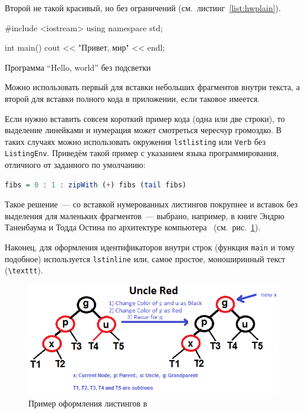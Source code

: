Второй не такой красивый, но без ограничений (см.~листинг~\ref{list:hwplain}).
\begin{ListingEnv}[H]
\begin{Verb}

#include <iostream>
using namespace std;

int main()
{
    cout << "Привет, мир" << endl;
}
\end{Verb}
\caption{Программа “Hello, world” без подсветки}
\label{list:hwplain}
\end{ListingEnv}

Можно использовать первый для вставки небольших фрагментов
внутри текста, а второй для вставки полного
кода в приложении, если таковое имеется.

Если нужно вставить совсем короткий пример кода (одна или две строки), то выделение  линейками и нумерация может смотреться чересчур громоздко. В таких случаях можно использовать окружения \texttt{lstlisting} или \texttt{Verb} без \texttt{ListingEnv}. Приведём такой пример с указанием языка программирования, отличного от заданного по умолчанию:
\begin{lstlisting}[language=Haskell]
fibs = 0 : 1 : zipWith (+) fibs (tail fibs)
\end{lstlisting}
Такое решение~--- со вставкой нумерованных листингов покрупнее
и вставок без выделения для маленьких фрагментов~--- выбрано,
например, в книге Эндрю Таненбаума и Тодда Остина по архитектуре
компьютера~\autocite{TanAus2013} (см.~рис.~\ref{fig:tan-aus}).

Наконец, для оформления идентификаторов внутри строк
(функция \lstinline{main} и тому подобное) используется
\texttt{lstinline} или, самое простое, моноширинный текст
(\texttt{\textbackslash texttt}).

\begin{figure}[p]%
\centering
\includegraphics[width=\textwidth]{img/tan-aus.png}
\caption{\label{fig:tan-aus}Пример оформления листингов в~\autocite{TanAus2013}}
\end{figure}

